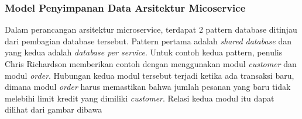 \subsubsection{Model Penyimpanan Data Arsitektur Micoservice}
Dalam perancangan arsitektur microservice, terdapat 2 pattern database ditinjau dari pembagian database tersebut. Pattern pertama adalah \textit{shared database} dan yang kedua adalah \textit{database per service}. Untuk contoh kedua pattern, penulis Chris Richardson memberikan contoh dengan menggunakan modul \textit{customer} dan modul \textit{order}. Hubungan kedua modul tersebut terjadi ketika ada transaksi baru, dimana modul \textit{order} harus memastikan bahwa jumlah pesanan yang baru tidak melebihi limit kredit yang dimiliki \textit{customer}. Relasi kedua modul itu dapat dilihat dari gambar dibawa \cite{6}\\

\begin{adjustbox}{width=1\textwidth}
	\centering
	\begin{minipage}{\linewidth}
	\end{minipage}
\end{adjustbox}\\


